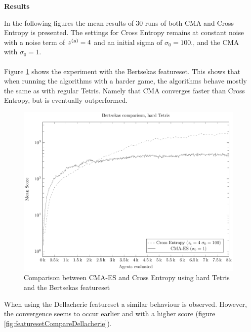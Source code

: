 \textbf{Results}

In the following figures the mean results of 30 runs of both CMA and Cross 
Entropy is presented. The settings for Cross Entropy remains at constant noise
with a noise term of $z^{(g)} = 4$ and an initial sigma of $\sigma_0 = 100.$, 
and the CMA with $\sigma_0 = 1$.\\
\\
Figure \ref{fig:featuresetCompareBertsekas} shows the experiment with the 
Bertsekas featureset. This shows that when running the algorithms with a
harder game, the algorithms behave mostly the same as with regular 
Tetris. Namely that CMA converges faster than Cross Entropy, 
but is eventually outperformed.

\begin{figure}[H]
\includegraphics[scale=1]{plots/plotBertsekasCmaVsCEHardTetris}
\caption{Comparison between CMA-ES and Cross Entropy 
using hard Tetris and the Bertsekas featureset 
\label{fig:featuresetCompareBertsekas}}
\end{figure}

When using the Dellacherie featureset a similar behaviour is observed.
However, the convergence seems to occur earlier and with a higher score
(figure \ref{fig:featuresetCompareDellacherie}).

